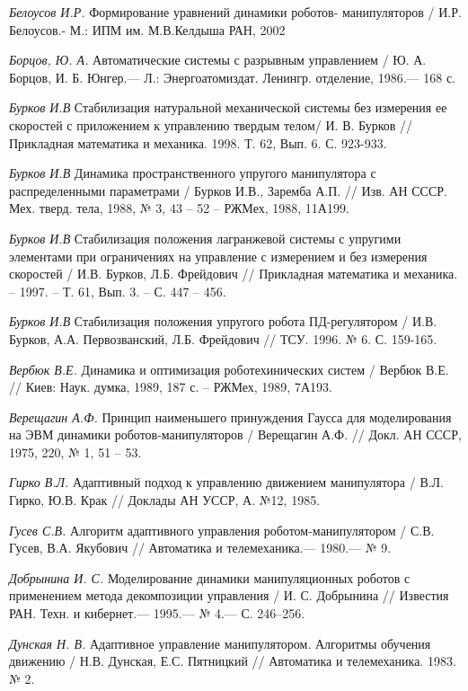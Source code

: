 \begin{thebibliography}{10}
	{\it Белоусов И.Р.} Формирование уравнений динамики роботов-  манипуляторов / И.Р. Белоусов.- М.: ИПМ им. М.В.Келдыша РАН, 2002
	
	{\it Борцов, Ю. А.} Автоматические системы с разрывным управлением / Ю. А. Борцов,
	И. Б. Юнгер.— Л.: Энергоатомиздат. Ленингр. отделение, 1986.— 168 с.
	
	{\it Бурков И.В} Стабилизация натуральной механической системы без измерения ее скоростей с приложением к управлению твердым телом/ И. В. 		Бурков // Прикладная математика и механика. 1998. Т. 62, Вып. 6. С. 923-933.
	
	{\it Бурков И.В} Динамика пространственного упругого манипулятора с распределенными параметрами / Бурков И.В., Заремба А.П. // Изв. АН СССР. 		Мех. тверд. тела, 1988, № 3, 43 – 52 – РЖМех, 1988, 11А199.
	
	{\it Бурков И.В} Стабилизация положения лагранжевой системы с упругими элементами при ограничениях на управление с измерением и без 			измерения скоростей / И.В. Бурков, Л.Б. Фрейдович // Прикладная математика и механика. – 1997. – Т. 61, Вып. 3. – С. 447 – 456.
	
	{\it Бурков И.В} Стабилизация положения упругого робота ПД-регулятором / И.В. Бурков, А.А. Первозванский, Л.Б. Фрейдович // ТСУ. 1996. № 6. С. 159-165.
	
	{\it Вербюк В.Е.} Динамика и оптимизация роботехинических систем / Вербюк В.Е. // Киев: Наук. думка, 1989, 187 с. – РЖМех, 1989, 7А193.
	
	{\it Верещагин А.Ф.} Принцип наименьшего принуждения Гаусса для моделирования на ЭВМ динамики роботов-манипуляторов / Верещагин А.Ф. // Докл. АН 	СССР, 1975, 220, № 1, 51 – 53.
	
	{\it Гирко В.Л.} Адаптивный подход к управлению движением манипулятора / В.Л. Гирко, Ю.В. Крак // Доклады АН УССР, А. №12, 1985.
	
	{\it Гусев С.В.} Алгоритм адаптивного управления роботом-манипулятором / С.В. Гусев, В.А. Якубович // Автоматика и телемеханика.— 1980.— № 9.
	
	{\it Добрынина И. С.} Моделирование динамики манипуляционных роботов с применением метода декомпозиции управления / И. С. Добрынина // Известия РАН. Техн. и кибернет.— 1995.— № 4.— С. 246–256.

	{\it Дунская Н. В.} Адаптивное управление манипулятором. Алгоритмы обучения движению / Н.В. Дунская, Е.С. Пятницкий // Автоматика и телемеханика. 1983. № 2. 
	

\end{thebibliography}
